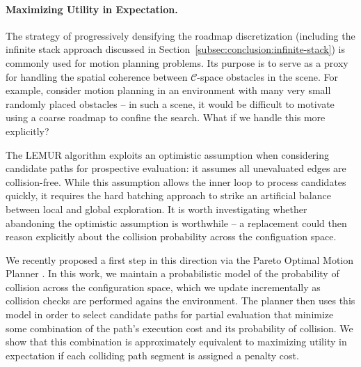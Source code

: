 
\paragraph{Maximizing Utility in Expectation.}
The strategy of progressively densifying the roadmap discretization
(including the infinite stack approach discussed
in Section~\ref{subsec:conclusion:infinite-stack})
is commonly used for motion planning problems.
Its purpose is to serve as a proxy for handling the spatial coherence
between $\mathcal{C}$-space obstacles in the scene.
For example,
consider motion planning in an environment with many very small
randomly placed obstacles --
in such a scene, it would be difficult to motivate using a coarse
roadmap to confine the search.
What if we handle this more explicitly?

The LEMUR algorithm exploits an optimistic assumption when considering
candidate paths for prospective evaluation:
it assumes all unevaluated edges are collision-free.
While this assumption allows the inner loop to process candidates
quickly,
it requires the hard batching approach to strike an artificial
balance between local and global exploration.
It is worth investigating whether abandoning the optimistic
assumption is worthwhile --
a replacement could then reason explicitly about the collision
probability across the configuation space.

We recently proposed a first step in this direction
via the Pareto Optimal Motion Planner \citep{choudhury2016pomp}.
In this work,
we maintain a probabilistic model of the probability of collision
across the configuration space,
which we update incrementally as collision checks are performed
agains the environment.
The planner then uses this model in order to select candidate paths
for partial evaluation that minimize some combination of the path's
execution cost and its probability of collision.
We show that this combination is approximately equivalent
to maximizing utility in expectation
if each colliding path segment is assigned a penalty cost.

